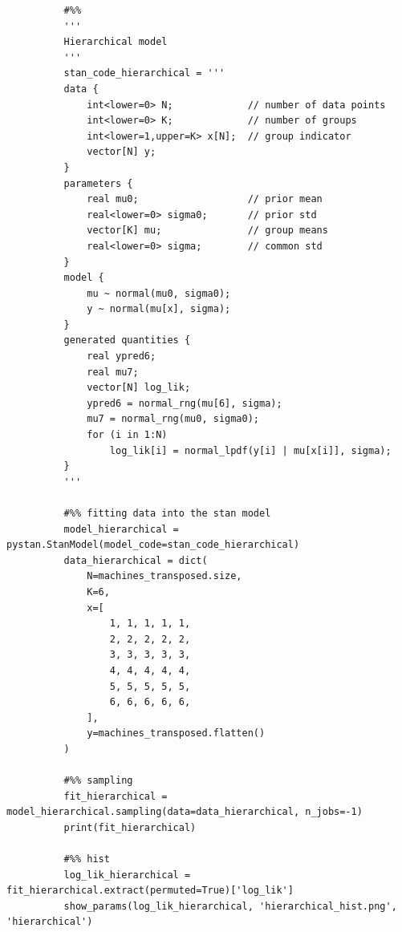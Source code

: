 \documentclass[11pt,a4paper,english]{article}
\begin{document}
\begin{appendices}
\begin{verbatim}
          #%%
          '''
          Hierarchical model
          '''
          stan_code_hierarchical = '''
          data {
              int<lower=0> N;             // number of data points
              int<lower=0> K;             // number of groups
              int<lower=1,upper=K> x[N];  // group indicator
              vector[N] y;
          }
          parameters {
              real mu0;                   // prior mean
              real<lower=0> sigma0;       // prior std
              vector[K] mu;               // group means
              real<lower=0> sigma;        // common std
          }
          model {
              mu ~ normal(mu0, sigma0);
              y ~ normal(mu[x], sigma);
          }
          generated quantities {
              real ypred6;
              real mu7;
              vector[N] log_lik;
              ypred6 = normal_rng(mu[6], sigma);
              mu7 = normal_rng(mu0, sigma0);
              for (i in 1:N)
                  log_lik[i] = normal_lpdf(y[i] | mu[x[i]], sigma);
          }
          '''

          #%% fitting data into the stan model
          model_hierarchical = pystan.StanModel(model_code=stan_code_hierarchical)
          data_hierarchical = dict(
              N=machines_transposed.size,
              K=6,
              x=[
                  1, 1, 1, 1, 1,
                  2, 2, 2, 2, 2,
                  3, 3, 3, 3, 3,
                  4, 4, 4, 4, 4,
                  5, 5, 5, 5, 5,
                  6, 6, 6, 6, 6,
              ],
              y=machines_transposed.flatten()
          )

          #%% sampling
          fit_hierarchical = model_hierarchical.sampling(data=data_hierarchical, n_jobs=-1)
          print(fit_hierarchical)

          #%% hist
          log_lik_hierarchical = fit_hierarchical.extract(permuted=True)['log_lik']
          show_params(log_lik_hierarchical, 'hierarchical_hist.png', 'hierarchical')
        \end{verbatim}
      \end{appendices}
  
\end{document}
